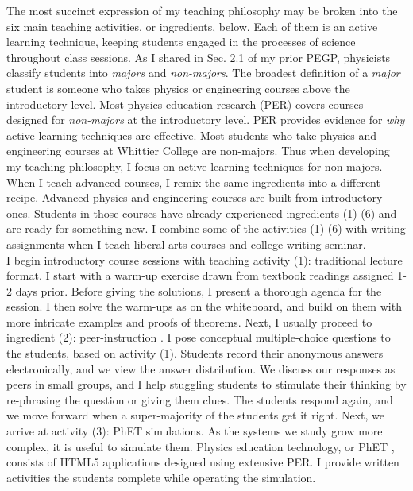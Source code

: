 \documentclass[../../../main.tex]{subfiles}
\begin{document}
The most succinct expression of my teaching philosophy may be broken into the six main teaching activities, or ingredients, below.  Each of them is an active learning technique, keeping students engaged in the processes of science throughout class sessions.  As I shared in Sec. 2.1 of my prior PEGP, physicists classify students into \textit{majors} and \textit{non-majors}.  The broadest definition of a \textit{major} student is someone who takes physics or engineering courses above the introductory level.  Most physics education research (PER) covers courses designed for \textit{non-majors} at the introductory level.  PER provides evidence for \textit{why} active learning techniques are effective.  Most students who take physics and engineering courses at Whittier College are non-majors.  Thus when developing my teaching philosophy, I focus on active learning techniques for non-majors.  When I teach advanced courses, I remix the same ingredients into a different recipe.  Advanced physics and engineering courses are built from introductory ones.  Students in those courses have already experienced ingredients (1)-(6) and are ready for something new.  I combine some of the activities (1)-(6) with writing assignments when I teach liberal arts courses and college writing seminar.
\\
\vspace{0.25cm}
I begin introductory course sessions with teaching activity (1): traditional lecture format.  I start with a warm-up exercise drawn from textbook readings assigned 1-2 days prior.  Before giving the solutions, I present a thorough agenda for the session.  I then solve the warm-ups as on the whiteboard, and build on them with more intricate examples and proofs of theorems.  Next, I usually proceed to ingredient (2): peer-instruction \cite{mazur2013peer}.  I pose conceptual multiple-choice questions to the students, based on activity (1).  Students record their anonymous answers electronically, and we view the answer distribution.  We discuss our responses as peers in small groups, and I help stuggling students to stimulate their thinking by re-phrasing the question or giving them clues.  The students respond again, and we move forward when a super-majority of the students get it right.  Next, we arrive at activity (3): PhET simulations.  As the systems we study grow more complex, it is useful to simulate them.  Physics education technology, or PhET \cite{phet}, consists of HTML5 applications designed using extensive PER.  I provide written activities the students complete while operating the simulation.
\end{document}
